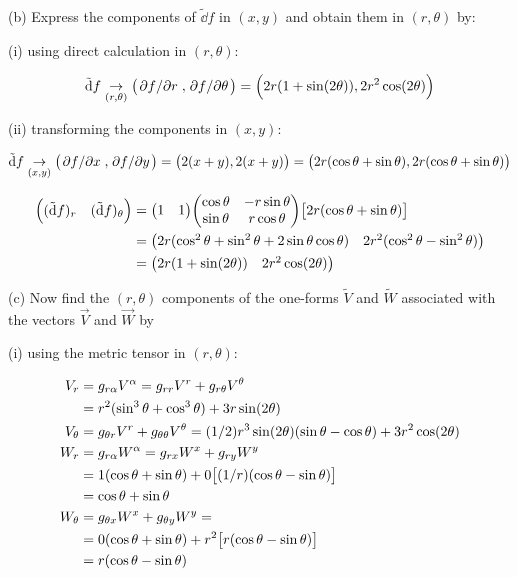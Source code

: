 \documentclass[gr-notes.tex]{subfiles}
\begin{document}
(b)
Express the components of $\tilde{\dd}f$ in $(x,y)$ and obtain them in $(r,\theta)$ by:

(i) using direct calculation in $(r, \theta)$:

\begin{displaymath}
  \tilde{\dd}f \underset{(r,\theta)}{\to}
  \qty( \pdv*{f}{r}, \pdv*{f}{\theta} ) =
  \qty( 2 r (1 + \sin(2 \theta)), 2 r^2 \cos(2 \theta) )
\end{displaymath}

(ii) transforming the components in $(x, y)$:

\begin{displaymath}
  \tilde{\dd}f \underset{(x,y)}{\to}
  \qty( \pdv*{f}{x}, \pdv*{f}{y} ) =
  \qty( 2 (x+y), 2 (x+y) ) =
  \qty( 2 r (\cos\theta + \sin\theta), 2 r (\cos\theta + \sin\theta))
\end{displaymath}

\begin{align*}
  \mqty( (\tilde{\dd}f)_r & (\tilde{\dd}f)_\theta ) &=
  \mqty( 1 & 1 )
  \mqty( \cos\theta & -r\sin\theta \\ \sin\theta & r\cos\theta )
  \qty[ 2 r (\cos\theta + \sin\theta) ]
  \\ &=
  \mqty( 2 r  (\cos^2\theta + \sin^2\theta + 2 \sin\theta\cos\theta) &
         2 r^2 (\cos^2\theta - \sin^2\theta) )
  \\ &=
  \mqty( 2 r (1 + \sin(2 \theta)) & 2 r^2 \cos(2 \theta) )
\end{align*}


(c)
Now find the $(r,\theta)$ components of the one-forms $\tilde{V}$ and $\tilde{W}$ associated with the vectors $\vec{V}$ and $\vec{W}$ by

(i)
using the metric tensor in $(r,\theta)$:


\begin{align*}
  V_r &=
  g_{r\alpha} V^\alpha =
  g_{rr} V^r + g_{r\theta} V^\theta
  \\ &=
  r^2 (\sin^3\theta + \cos^3\theta) + 3 r \sin(2\theta)
  \\
  V_\theta &=
  g_{\theta r} V^r + g_{\theta\theta} V^\theta =
  (1/2) r^3 \sin(2\theta) (\sin\theta - \cos\theta) +
  3 r^2 \cos(2\theta)
  \\
  W_r &=
  g_{r\alpha} W^\alpha =
  g_{rx} W^x + g_{ry} W^y
  \\ &=
  1 (\cos\theta + \sin\theta) +
  0 \qty[ (1/r) (\cos\theta - \sin\theta) ]
  \\ &=
  \cos\theta + \sin\theta
  \\
  W_\theta &=
  g_{\theta x} W^x + g_{\theta y} W^y =
  \\ &=
  0 (\cos\theta + \sin\theta) +
  r^2 \qty[ r (\cos\theta - \sin\theta) ]
  \\ &=
  r (\cos\theta - \sin\theta)
\end{align*}
\end{document}
